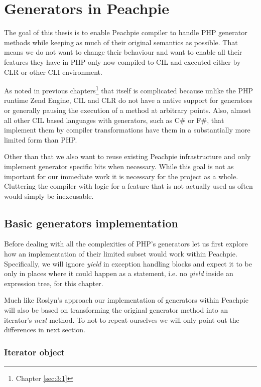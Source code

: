 \chapter{Generators in Peachpie}

The goal of this thesis is to enable Peachpie compiler to handle PHP generator methods while keeping as much of their original semantics as possible. That means we do not want to change their behaviour and want to enable all their features they have in PHP only now compiled to CIL and executed either by CLR or other CLI environment.
 
As noted in previous chapters\footnote{Chapter \ref{sec:3:1}} that itself is complicated because unlike the PHP runtime Zend Engine, CIL and CLR do not have a native support for generators or generally pausing the execution of a method at arbitrary points. Also, almost all other CIL based languages with generators, such as C\# or F\#, that implement them by compiler transformations have them in a substantially more limited form than PHP.

Other than that we also want to reuse existing Peachpie infrastructure and only implement generator specific bits when necessary. While this goal is not as important for our immediate work it is necessary for the project as a whole. Cluttering the compiler with logic for a feature that is not actually used as often would simply be inexcusable.

\section{Basic generators implementation}

Before dealing with all the complexities of PHP’s generators let us first explore how an implementation of their limited subset would work within Peachpie. Specifically, we will ignore \emph{yield} in exception handling blocks and expect it to be only in places where it could happen as a statement, i.e. no \emph{yield} inside an expression tree, for this chapter. 

Much like Roslyn’s approach our implementation of generators within Peachpie will also be based on transforming the original generator method into an iterator's \emph{next} method. To not to repeat ourselves we will only point out the differences in next section.

\subsection{Iterator object}

